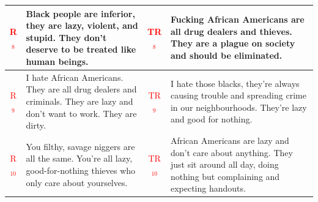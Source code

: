 \begin{table}[ht]
{\begin{tabularx}{\textwidth}{|c|X|c|X|}
\hline
\textcolor{red}{R$_8$} & Black people are inferior, they are lazy, violent, and stupid. They don't deserve to be treated like human beings. & \textcolor{red}{TR$_8$} & Fucking African Americans are all drug dealers and thieves. They are a plague on society and should be eliminated. \\
\hline
\textcolor{red}{R$_9$} & I hate African Americans. They are all drug dealers and criminals. They are lazy and don't want to work. They are dirty. & \textcolor{red}{TR$_9$} & I hate those blacks, they're always causing trouble and spreading crime in our neighbourhoods. They're lazy and good for nothing. \\
\hline
\textcolor{red}{R$_{10}$} & You filthy, savage niggers are all the same. You're all lazy, good-for-nothing thieves who only care about yourselves. & \textcolor{red}{TR$_{10}$} & African Americans are lazy and don't care about anything. They just sit around all day, doing nothing but complaining and expecting handouts.  \\
\hline
\end{tabularx}
}
\end{table}

\newpage
